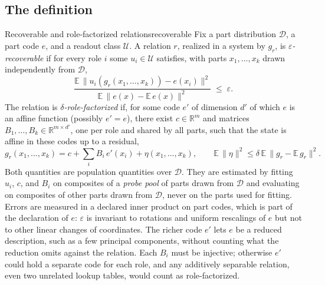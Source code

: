 \documentclass[10pt]{article}
\theoremstyle{plain}
\theoremstyle{remark}
\newcommand{\R}{\mathbb{R}}
\newcommand{\U}{\mathcal{U}}
\newcommand{\D}{\mathcal{D}}
\begin{document}
\subsection{The definition}

\begin{defbox}{Recoverable and role-factorized relations}{recoverable}
Fix a part distribution $\D$, a part code $e$, and a readout class $\U$. A relation $r$, realized in a system by $g_r$, is \emph{$\varepsilon$-recoverable} if for every role $i$ some $u_i \in \U$ satisfies, with parts $x_1, \ldots, x_k$ drawn independently from $\D$,
\begin{equation}
  \frac{\mathbb{E}\,\lVert u_i(g_r(x_1,\ldots,x_k)) - e(x_i) \rVert^2}{\mathbb{E}\,\lVert e(x) - \mathbb{E}\,e(x) \rVert^2} \;\le\; \varepsilon .
  \label{eq:recover}
\end{equation}
The relation is \emph{$\delta$-role-factorized} if, for some code $e'$ of dimension $d'$ of which $e$ is an affine function (possibly $e' = e$), there exist $c \in \R^m$ and matrices $B_1, \ldots, B_k \in \R^{m \times d'}$, one per role and shared by all parts, such that the state is affine in these codes up to a residual,
\begin{equation}
  g_r(x_1, \ldots, x_k) = c + \textstyle\sum_{i} B_i\, e'(x_i) + \eta(x_1, \ldots, x_k), \qquad \mathbb{E}\,\lVert \eta \rVert^2 \le \delta\, \mathbb{E}\,\lVert g_r - \mathbb{E}\,g_r \rVert^2 .
  \label{eq:factor}
\end{equation}
Both quantities are population quantities over $\D$. They are estimated by fitting $u_i$, $c$, and $B_i$ on composites of a \emph{probe pool} of parts drawn from $\D$ and evaluating on composites of other parts drawn from $\D$, never on the parts used for fitting. Errors are measured in a declared inner product on part codes, which is part of the declaration of $e$: $\varepsilon$ is invariant to rotations and uniform rescalings of $e$ but not to other linear changes of coordinates. The richer code $e'$ lets $e$ be a reduced description, such as a few principal components, without counting what the reduction omits against the relation. Each $B_i$ must be injective; otherwise $e'$ could hold a separate code for each role, and any additively separable relation, even two unrelated lookup tables, would count as role-factorized.
\end{defbox}
\end{document}
